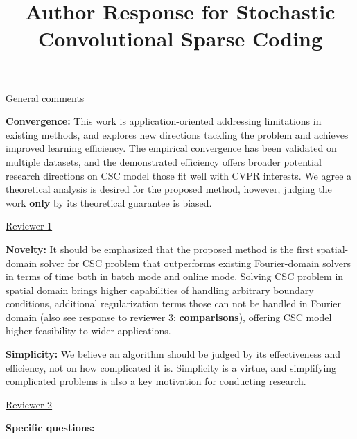 \documentclass[10pt,twocolumn,letterpaper]{article}
\begin{document}
\title{Author Response for Stochastic Convolutional Sparse Coding}  %

\maketitle
\thispagestyle{empty}

\underline{General comments}

\textbf{Convergence:} This work is application-oriented addressing limitations in existing methods, and explores new directions tackling the problem and achieves improved learning efficiency. The empirical convergence has been validated on multiple datasets, and the demonstrated efficiency offers broader potential research directions on CSC model those fit well with CVPR interests. We agree a theoretical analysis is desired for the proposed method, however, judging the work \textbf{only} by its theoretical guarantee is biased.


\underline{Reviewer 1}

\textbf{Novelty:}
It should be emphasized that the proposed method is the first spatial-domain solver for CSC problem that outperforms existing Fourier-domain solvers in terms of time both in batch mode and online mode. Solving CSC problem in spatial domain brings higher capabilities of handling arbitrary boundary conditions, additional regularization terms those can not be handled in Fourier domain (also see response to reviewer 3: \textbf{comparisons}), offering CSC model higher feasibility to wider applications.

\textbf{Simplicity:} We believe an algorithm should be judged by its effectiveness and efficiency, not on how complicated it is. Simplicity is a virtue, and simplifying complicated problems is also a key motivation for conducting research.


\underline{Reviewer 2}

\textbf{Specific questions:}
\end{document}
